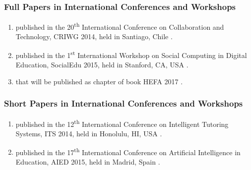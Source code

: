 \subsubsection*{Full Papers in International Conferences and Workshops}


\begin{enumerate}
\item
{} published in the 20\textsuperscript{th} International Conference on Collaboration and Technology, CRIWG 2014, held in Santiago, Chile \cite{ChallcoMoreiraMizoguchiIsotani2014}.

\item
{} published in the 1\textsuperscript{st} International Workshop on Social Computing in Digital Education, SocialEdu 2015, held in Stanford, CA, USA \cite{ChallcoMizoguchiBittencourtIsotani2016}.

\item
{} that will be published as chapter of book  HEFA 2017 \cite{ChallcoMizoguchiIsotani2018}.
\end{enumerate}


\subsubsection*{Short Papers in International Conferences and Workshops}

\begin{enumerate}
\item
{} published in the 12\textsuperscript{th} International Conference on Intelligent Tutoring Systems, ITS 2014, held in Honolulu, HI, USA \cite{ChallcoMoreiraMizoguchiIsotani2014a}.

\item
{} published in the 17\textsuperscript{th} International Conference on Artificial Intelligence in Education, AIED 2015, held in Madrid, Spain \cite{ChallcoMizoguchiBittencourtIsotani2015a}.
\end{enumerate}


